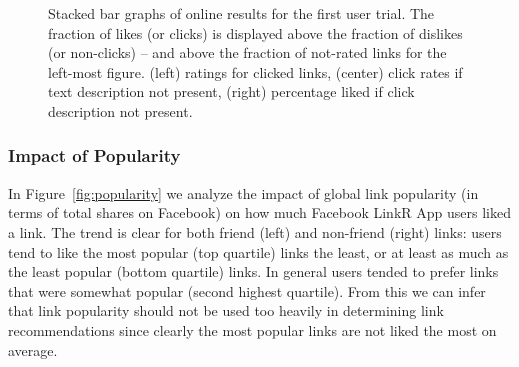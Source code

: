 \begin{figure}[t!]
\caption{Stacked bar graphs of online results for the first 
user trial.  The fraction of likes (or clicks) is displayed above 
the fraction of dislikes (or non-clicks) -- and above the fraction of not-rated
links for the left-most figure.  
(left) ratings for clicked links, (center) click rates if
text description not present, 
(right) percentage liked if click description not present.}
\label{fig:click_evidence}
\end{figure}

\subsubsection{Impact of Popularity}

In Figure~\ref{fig:popularity} we analyze the impact of global link
popularity (in terms of total shares on Facebook) 
on how much Facebook LinkR App users liked a link.
The trend is clear for both friend (left) and non-friend (right)
links: users tend to like the most popular (top quartile) 
links the least, or at least as much as the least popular (bottom quartile)
links.  In general users tended to prefer links that were somewhat
popular (second highest quartile).  From this we can infer that
link popularity should not be used too heavily in determining link
recommendations since clearly the most popular links are not liked
the most on average.

